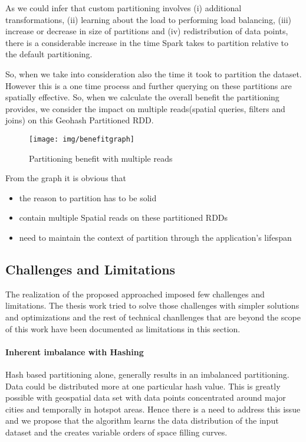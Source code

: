 \documentclass[article,type=msc,colorback,12pt,accentcolor=tud1d]{tudthesis}
\begin{document}
			As we could infer that custom partitioning involves (i) additional transformations, (ii) learning about the load to performing load balancing, (iii) increase or decrease in size of partitions and  (iv) redistribution of data points, there is a considerable increase in the time Spark takes to partition relative to the default partitioning. 
			
			So, when we take into consideration also the time it took to partition the dataset. However this is a one time process and further querying on these partitions are spatially effective. So, when we calculate the overall benefit the partitioning provides, we consider the impact on multiple reads(spatial queries, filters and joins) on this Geohash Partitioned RDD. 
							 
				\begin{figure}[h]
				\centering
				\texttt{[image: img/benefitgraph]}
				\caption{Partitioning benefit with multiple reads}
				\label{fig:benefitgraph}
				\end{figure}
			
			From the graph it is obvious that 
			\begin{itemize}
				\item the reason to partition has to be solid 
				\item contain multiple Spatial reads on these partitioned RDDs
				\item need to maintain the context of partition through the application’s lifespan
			\end{itemize}
						  
		  \clearpage
		  \subsection{Challenges and Limitations}
		  
		  The realization of the proposed approached imposed few challenges and limitations. The thesis work tried to solve those challenges with simpler solutions and optimizations and the rest of technical chanllenges that are beyond the scope of this work have been documented as limitations in this section.
		  
		  \paragraph{Inherent imbalance with Hashing}
			  Hash based partitioning alone, generally results in an imbalanced partitioning. Data could be distributed more at one particular hash value. This is greatly possible with geospatial data set with data points concentrated around major cities and temporally in hotspot areas. Hence there is a need to address this issue and we propose that the algorithm learns the data distribution of the input dataset and the creates variable orders of space filling curves. 
			  
\end{document}

